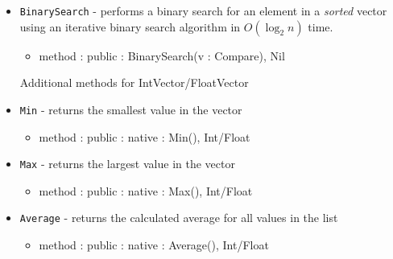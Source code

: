 \documentclass[12pt]{article}
\begin{document}
\begin{itemize}
\begin{itemize}
	\end{itemize}
    \item \texttt{BinarySearch} - performs a binary search for an element in a \emph{sorted} vector using an iterative binary search algorithm in $O(\log_2 n)$ time.
    	\begin{itemize}
	\item method : public : BinarySearch(v : Compare), Nil
	\end{itemize}
Additional methods for IntVector/FloatVector
    \item \texttt{Min} - returns the smallest value in the vector
    	\begin{itemize}
	\item method : public : native : Min(), Int/Float
	\end{itemize}
    \item \texttt{Max} - returns the largest value in the vector
    	\begin{itemize}
	\item method : public : native : Max(), Int/Float
	\end{itemize}
    \item \texttt{Average} - returns the calculated average for all values in the list
    	\begin{itemize}
	\item method : public : native : Average(), Int/Float
	\end{itemize}
\end{itemize}
\end{document}

